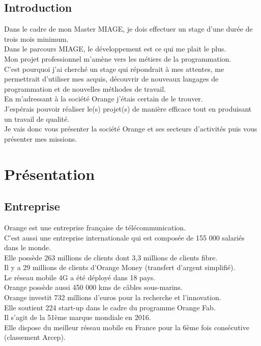 \documentclass[a4paper,twoside,12pt,openright]{report}
\begin{document}
\section{Introduction}
Dans le cadre de mon Master MIAGE, je dois effectuer un stage d’une durée de trois mois minimum.\\
Dans le parcours MIAGE, le développement est ce qui me plait le plus.\\
Mon projet professionnel m'amène vers les métiers de la programmation.\\
C'est pourquoi j'ai cherché un stage qui répondrait à mes attentes, me permettrait d'utiliser mes acquis, découvrir de nouveaux langages de programmation et de nouvelles méthodes de travail.\\
En m'adressant à la société Orange j'étais certain de le trouver.\\
J'espérais pouvoir réaliser le(s) projet(s) de manière efficace tout en produisant un travail de qualité.\\
Je vais donc vous présenter la société Orange et ses secteurs d'activités puis vous présenter mes missions.\\
\chapter{Présentation}
\section{Entreprise}
Orange est une entreprise française de télécommunication.\\
C'est aussi une entreprise internationale qui est composée de 155 000 salariés dans le monde.\\
Elle possède 263 millions de clients dont 3,3 millions de clients fibre.\\
 Il y a 29 millions de clients d’Orange Money (transfert d'argent simplifié).\\ 
 Le réseau mobile 4G a été déployé dans 18 pays.\\
 Orange possède aussi 450 000 kms de câbles sous-marins.\\
Orange investit 732 millions d’euros pour la recherche et l’innovation.\\
Elle soutient 224 start-up dans le cadre du programme Orange Fab.\\
 Il s’agit de la 51ème marque mondiale en 2016.\\ 
 Elle dispose du meilleur réseau mobile en France pour la 6ème fois consécutive (classement Arcep).
\end{document}
